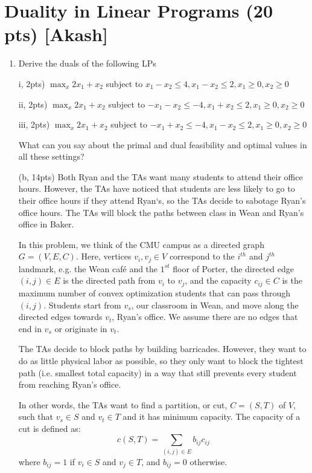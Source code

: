 \documentclass{article}
\theoremstyle{remark}
\theoremstyle{definition}
\begin{document}
\section{Duality in Linear Programs (20 pts) [Akash]}
\begin{enumerate}
	\item Derive the duals of the following LPs

		i, 2pts) $\max_x 2x_1 + x_2$ subject to $x_1 - x_2 \leq 4, x_1 - x_2 \leq 2, x_1 \geq 0, x_2 \geq 0$ 

		ii, 2pts) $\max_x 2x_1 + x_2$ subject to $-x_1 - x_2 \leq -4, x_1 + x_2 \leq 2, x_1 \geq 0, x_2 \geq 0$ 

		iii, 2pts) $\max_x 2x_1 + x_2$ subject to $-x_1 + x_2 \leq -4, x_1 - x_2 \leq 2, x_1 \geq 0, x_2 \geq 0$ 

		What can you say about the primal and dual feasibility and optimal values in all these settings? 

	\item[(b, 14pts)] Both Ryan and the TAs want many students to attend their office hours. However, the TAs have noticed that students are less likely to go to their office hours if they attend Ryan`s, so the TAs decide to sabotage Ryan's 	office hours. The TAs will block the paths between class in Wean and Ryan's office in Baker. 
	
		\quad \quad In this problem, we think of the CMU campus as a directed graph $G = (V,E,C)$. Here, vertices $v_i,v_j\in V$ correspond to the $i^{th}$ and $j^{th}$ landmark, e.g. the Wean caf\'{e} and the $1^{st}$ floor of Porter, the directed edge $(i,j) \in E$ is the directed path from $v_i$ to $v_j$, and the capacity $c_{ij} \in C$ is the maximum number of convex optimization students that can pass through $(i,j)$. Students start from $v_s$, our classroom in Wean, and move along the directed edges towards $v_t$, Ryan's office. We assume there are no edges that end in $v_s$ or originate in $v_t$.
		
		\quad \quad The TAs decide to block paths by building barricades. However, they want to do as little physical labor as possible, so they only want to block the tightest path (i.e. smallest total capacity) in a way that still prevents every student from reaching Ryan's office.
		
		\quad \quad In other words, the TAs want to find a partition, or cut, $C = (S,T)$ of $V$, such that $v_s \in S$ and $v_t \in T$ and it has minimum capacity. The capacity of a cut is defined as:
		\begin{equation*}
		    c(S,T) = \sum_{(i,j)\in E}b_{ij}c_{ij}
		\end{equation*}
		where $b_{ij} = 1$ if $v_i \in S$ and $v_j \in T$, and $b_{ij} = 0$ otherwise.
		

\end{enumerate}
\end{document}
